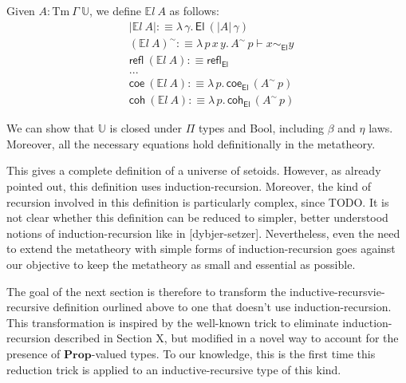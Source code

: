 \documentclass{easychair}
\newcommand{\GG}{\Gamma}
\newcommand{\mProp}{\mathbf{Prop}}
\newcommand{\Tm}{\mathrm{Tm}}
\newcommand{\El}{\textsf{El}}
\newcommand{\Uty}{\mathds{U}}
\newcommand{\EL}{\mathds{E}l}
\newcommand{\reflel}{\textsf{refl}_\El}
\newcommand{\eqel}[3]{#1 \vdash #2 \sim_\El #3}
\begin{document}
Given $A : \Tm\ \GG\ \Uty$, we define $\EL\ A$ as follows:
%
\begin{align*}
  & | \EL\ A | :\equiv \lambda \, \gamma . \, \El\ (| A | \,\gamma) \\
  & (\EL\ A)^\sim :\equiv \lambda \, p \, x \, y . \, \eqel{A^\sim\,p}{x}{y} \\
  & \textsf{refl}\ (\EL\ A) :\equiv \reflel \\
  & ... \\
  & \textsf{coe}\ (\EL\ A) :\equiv \lambda\,p.\, \textsf{coe}_{\El}\,(A^\sim\,p) \\
  & \textsf{coh}\ (\EL\ A) :\equiv \lambda\,p.\, \textsf{coh}_{\El}\,(A^\sim\,p)
\end{align*}

We can show that $\Uty$ is closed under $\Pi$ types and \textsf{Bool}, including
$\beta$ and $\eta$ laws. Moreover, all the necessary equations hold
definitionally in the metatheory.

This gives a complete definition of a universe of setoids. However, as already
pointed out, this definition uses induction-recursion. Moreover, the kind of
recursion involved in this definition is particularly complex, since TODO. It is
not clear whether this definition can be reduced to simpler, better understood
notions of induction-recursion like in [dybjer-setzer]. Nevertheless, even the
need to extend the metatheory with simple forms of induction-recursion goes
against our objective to keep the metatheory as small and essential as possible.

The goal of the next section is therefore to transform the
inductive-recursvie-recursive definition ourlined above to one that doesn't use
induction-recursion.
%
This transformation is inspired by the well-known trick to eliminate
induction-recursion described in Section X, but modified in a novel way to
account for the presence of $\mProp$-valued types. To our knowledge, this is the
first time this reduction trick is applied to an inductive-recursive type of
this kind.

\end{document}
